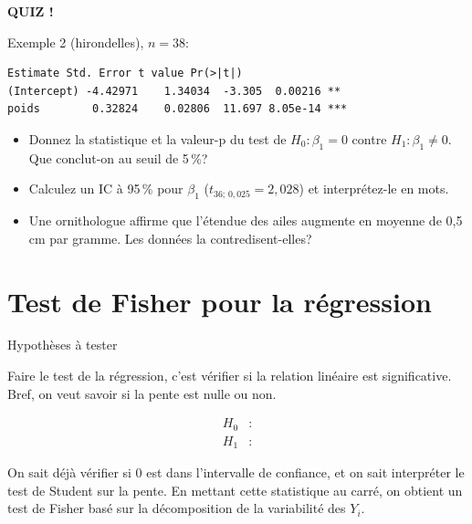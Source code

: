 \documentclass{BeamerTemplate}
\begin{document}
\begin{frame}
  \centerline{\LARGE\bfseries\alert{QUIZ !}}

  \medskip
  Exemple 2 (hirondelles), $n=38$:
\begin{Verbatim}[fontsize=\scriptsize]
            Estimate Std. Error t value Pr(>|t|)
(Intercept) -4.42971    1.34034  -3.305  0.00216 **
poids        0.32824    0.02806  11.697 8.05e-14 ***
\end{Verbatim}
  \begin{itemize}\itemsep 7mm
    \item Donnez la statistique et la valeur-p du test de $H_0:\beta_1=0$ contre
    $H_1:\beta_1\neq0$. Que conclut-on au seuil de 5\,\%?
    \item<2-> Calculez un IC à 95\,\% pour $\beta_1$ ($t_{36;\,0{,}025}=2{,}028$) et
    interprétez-le en mots.
    \item<3-> Une ornithologue affirme que l'étendue des ailes augmente en moyenne
    de 0,5\,cm par gramme. Les données la contredisent-elles?
  \end{itemize}
\end{frame}

\section{Test de Fisher pour la régression}

\begin{frame}[t]{Hypothèses à tester}

Faire le test de la régression, c'est vérifier si la relation linéaire est
\alert{significative}. Bref, on veut savoir si la pente est nulle ou non.

\medskip
\begin{align*}
H_0&:\\
H_1&:
\end{align*}

\medskip
On sait déjà vérifier si 0 est dans l'intervalle de confiance, et on sait
interpréter le test de Student sur la pente. En mettant cette statistique au
carré, on obtient un \alert{test de Fisher} basé sur la décomposition de la
variabilité des $Y_i$.

\end{frame}
\end{document}
